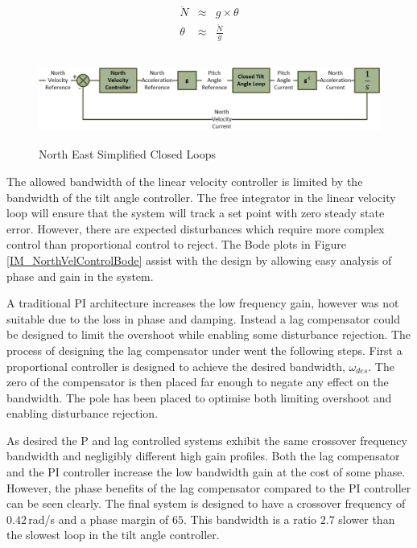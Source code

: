 	\begin{eqnarray}
	\ddot{N} &\approx& g\times \theta \label{EQ_LinearNorthVel2}\\\label{EQ_LinearNorthVel3}
	\theta 	&\approx& \frac{\ddot{N}}{g} \label{EQ_LinearNorthVel4}
	\end{eqnarray}
	
	\begin{figure}[H]
		\centering
		\includegraphics[height = 2.9cm]{../References/Diagrams/NorthVelocityLoop.jpg}
		\caption{North East Simplified Closed Loops}
		\label{IM_NorthVelocityLoop}
	\end{figure}
	
	The allowed bandwidth of the linear velocity controller is limited by the bandwidth of the tilt angle controller. The free integrator in the linear velocity loop will ensure that the system will track a set point with zero steady state error. However, there are expected disturbances which require more complex control than proportional control to reject. The Bode plots in Figure \ref{IM_NorthVelControlBode} assist with the design by allowing easy analysis of phase and gain in the system.
	
	A traditional PI architecture increases the low frequency gain, however was not suitable due to the loss in phase and damping. Instead a lag compensator could be designed to limit the overshoot while enabling some disturbance rejection. The process of designing the lag compensator under went the following steps. First a proportional controller is designed to achieve the desired bandwidth, $\omega_{des}$. The zero of the compensator is then placed far enough to negate any effect on the bandwidth. The pole has been placed to optimise both limiting overshoot and enabling disturbance rejection.
	
	As desired the P and lag controlled systems exhibit the same crossover frequency bandwidth and negligibly different high gain profiles. Both the lag compensator and the PI controller increase the low bandwidth gain at the cost of some phase. However, the phase benefits of the lag compensator compared to the PI controller can be seen clearly. The final system is designed to have a crossover frequency of $0.42$\,rad/s and a phase margin of $65$\textdegree. This bandwidth is a ratio $2.7$ slower than the slowest loop in the tilt angle controller.
			
